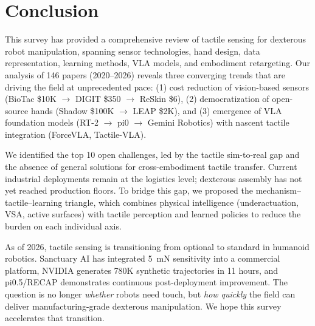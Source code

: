 \section{Conclusion}
\label{sec:conclusion}

This survey has provided a comprehensive review of tactile sensing for dexterous robot manipulation, spanning sensor technologies, hand design, data representation, learning methods, VLA models, and embodiment retargeting. Our analysis of 146 papers (2020--2026) reveals three converging trends that are driving the field at unprecedented pace: (1) cost reduction of vision-based sensors (BioTac \$10K $\to$ DIGIT \$350 $\to$ ReSkin \$6), (2) democratization of open-source hands (Shadow \$100K $\to$ LEAP \$2K), and (3) emergence of VLA foundation models (RT-2 $\to$ pi0 $\to$ Gemini Robotics) with nascent tactile integration (ForceVLA, Tactile-VLA).

We identified the top 10 open challenges, led by the tactile sim-to-real gap and the absence of general solutions for cross-embodiment tactile transfer. Current industrial deployments remain at the logistics level; dexterous assembly has not yet reached production floors. To bridge this gap, we proposed the mechanism--tactile--learning triangle, which combines physical intelligence (underactuation, VSA, active surfaces) with tactile perception and learned policies to reduce the burden on each individual axis.

As of 2026, tactile sensing is transitioning from optional to standard in humanoid robotics. Sanctuary AI has integrated 5~mN sensitivity into a commercial platform, NVIDIA generates 780K synthetic trajectories in 11 hours, and pi0.5/RECAP demonstrates continuous post-deployment improvement. The question is no longer \emph{whether} robots need touch, but \emph{how quickly} the field can deliver manufacturing-grade dexterous manipulation. We hope this survey accelerates that transition.
